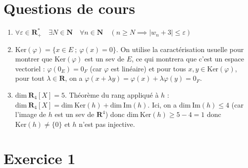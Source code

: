 \documentclass[10pt,a4paper,french]{article}
\begin{document}
\section*{Questions de cours}

\begin{enumerate}
	\item $\forall \varepsilon \in \mathbf{R}_+^* \quad \exists N \in \mathbf{N} \quad \forall n \in \mathbf{N} \quad (n \geq N \implies |w_n+3| \leq \varepsilon)$
	
	\item $\text{Ker}(\varphi) = \{x \in E \ ; \ \varphi(x)=0\}$. On utilise la caractérisation usuelle pour montrer que $\text{Ker}(\varphi)$ est un sev de $E$, ce qui montrera que c'est un espace vectoriel : $\varphi(0_E) = 0_F$ (car $\varphi$ est linéaire) et pour tous $x,y \in \text{Ker}(\varphi)$, pour tout $\lambda \in \mathbf{R}$, on a $\varphi(x+\lambda y) = \varphi(x) + \lambda \varphi(y) = 0_F$. 
	
	\item $\text{dim} \ \mathbf{R}_4[X] = 5$. Théorème du rang appliqué à $h$ : $\text{dim} \ \mathbf{R}_4[X] = \text{dim} \ \text{Ker}(h) + \text{dim} \ \text{Im}(h)$. Ici, on a $\text{dim} \ \text{Im}(h) \leq 4$ (car l'image de $h$ est un sev de $\mathbf{R}^4$) donc $\text{dim} \ \text{Ker}(h) \geq 5-4 = 1$ donc $\text{Ker}(h) \neq \{0\}$ et $h$ n'est pas injective.
\end{enumerate}
	
	
\section*{Exercice 1}
\end{document}
